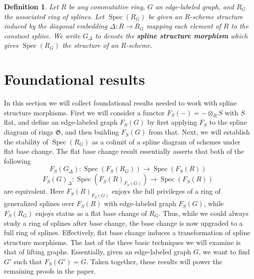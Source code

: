 \documentclass{article}
\DeclareMathOperator{\Spec}{Spec}
\newtheorem{definition}{Definition}
\begin{document}
\begin{definition}  
Let $R$ be any commutative ring, $G$ an edge-labeled graph, and $R_{G}$ the associated ring of splines. Let $\Spec(R_{G})$ be given an $R$-scheme structure induced by the diagonal embedding $\Delta : R \rightarrow R_G$ mapping each element of $R$ to the constant spline. We write $G_\Delta$ to denote the \textbf{spline structure morphism} which gives $\Spec(R_G)$ the structure of an $R$-scheme.
\end{definition}


\section{Foundational results}
In this section we will collect foundational results needed to work with spline structure morphisms. First we will consider a functor $F_S(-) = - \otimes_R S$ with $S$ flat, and define an edge-labeled graph $F_S(G)$ by first applying $F_S$ to the spline diagram of rings $\mathfrak G$, and then building $F_S(G)$ from that. Next, we will establish the stability of $\Spec(R_G)$ as a colimit of a spline diagram of schemes under flat base change. The flat base change result  essentially asserts that both of the following
\[ 
F_S(G_\Delta): \Spec(F_S(R_G)) \rightarrow  \Spec(F_S(R)) 
\]
\[
F_S(G)_\Delta: \Spec(F_S(R)_{F_S(G)}) \rightarrow \Spec(F_S(R))
\]
are equivalent. Here $F_S(R)_{F_S(G)}$ enjoys the full privileges of a ring of generalized splines over $F_S(R)$ with edge-labeled graph $F_S(G)$, while $F_S(R_G)$ enjoys status as a flat base change of $R_G$. Thus, while we could always study a ring of splines after base change, the base change is now upgraded to a full ring of splines. Effectively, flat base change induces a transformation of spline structure morphisms. The last of the three basic techniques we will examine is that of lifting graphs. Essentially, given an edge-labeled graph $G$, we want to find $G'$ such that $F_S(G')=G$. Taken together, these results will power the remaining proofs in the paper.
\end{document}
